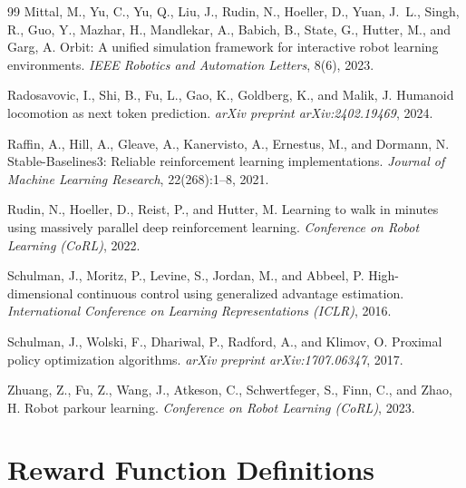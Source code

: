 \documentclass{article}
\begin{document}
\begin{thebibliography}{99}
Mittal, M., Yu, C., Yu, Q., Liu, J., Rudin, N., Hoeller, D., Yuan, J.~L.,
Singh, R., Guo, Y., Mazhar, H., Mandlekar, A., Babich, B., State, G.,
Hutter, M., and Garg, A.
\newblock Orbit: A unified simulation framework for interactive robot learning
environments.
\newblock \emph{IEEE Robotics and Automation Letters}, 8(6), 2023.

Radosavovic, I., Shi, B., Fu, L., Gao, K., Goldberg, K., and Malik, J.
\newblock Humanoid locomotion as next token prediction.
\newblock \emph{arXiv preprint arXiv:2402.19469}, 2024.

Raffin, A., Hill, A., Gleave, A., Kanervisto, A., Ernestus, M., and
Dormann, N.
\newblock Stable-Baselines3: Reliable reinforcement learning implementations.
\newblock \emph{Journal of Machine Learning Research}, 22(268):1–8, 2021.

Rudin, N., Hoeller, D., Reist, P., and Hutter, M.
\newblock Learning to walk in minutes using massively parallel deep
reinforcement learning.
\newblock \emph{Conference on Robot Learning (CoRL)}, 2022.

Schulman, J., Moritz, P., Levine, S., Jordan, M., and Abbeel, P.
\newblock High-dimensional continuous control using generalized advantage
estimation.
\newblock \emph{International Conference on Learning Representations (ICLR)},
2016.

Schulman, J., Wolski, F., Dhariwal, P., Radford, A., and Klimov, O.
\newblock Proximal policy optimization algorithms.
\newblock \emph{arXiv preprint arXiv:1707.06347}, 2017.

Zhuang, Z., Fu, Z., Wang, J., Atkeson, C., Schwertfeger, S., Finn, C.,
and Zhao, H.
\newblock Robot parkour learning.
\newblock \emph{Conference on Robot Learning (CoRL)}, 2023.

\end{thebibliography}

\appendix

\section{Reward Function Definitions}
\label{app:rewards}
\end{document}
